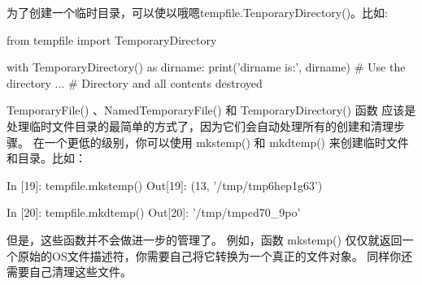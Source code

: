 为了创建一个临时目录，可以使以哦嗯tempfile.TenporaryDirectory()。比如:
\begin{python}
from tempfile import TemporaryDirectory

with TemporaryDirectory() as dirname:
    print('dirname is:', dirname)
    # Use the directory
    ...
# Directory and all contents destroyed
\end{python}
TemporaryFile() 、NamedTemporaryFile() 和 TemporaryDirectory() 函数 应该是处理临时文件目录的最简单的方式了，因为它们会自动处理所有的创建和清理步骤。 在一个更低的级别，你可以使用 mkstemp() 和 mkdtemp() 来创建临时文件和目录。比如：
\begin{python}
In [19]: tempfile.mkstemp()
Out[19]: (13, '/tmp/tmp6hep1g63')

In [20]: tempfile.mkdtemp()
Out[20]: '/tmp/tmpcd70_9po'
\end{python}
但是，这些函数并不会做进一步的管理了。 例如，函数 mkstemp() 仅仅就返回一个原始的OS文件描述符，你需要自己将它转换为一个真正的文件对象。 同样你还需要自己清理这些文件。

